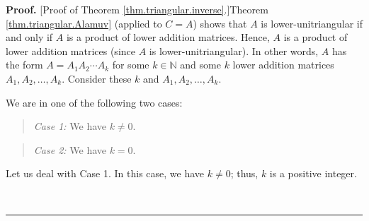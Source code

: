 \documentclass[numbers=enddot,12pt,final,onecolumn,notitlepage]{scrartcl}%
\theoremstyle{definition}
\newenvironment{statement}{\begin{quote}}{\end{quote}}
\newenvironment{proof}[1][Proof]{\noindent\textbf{#1.} }{\ \rule{0.5em}{0.5em}}
\begin{document}
\begin{proof}
[Proof of Theorem \ref{thm.triangular.inverse}.]Theorem
\ref{thm.triangular.Alamuv} (applied to $C=A$) shows that $A$ is
lower-unitriangular if and only if $A$ is a product of lower addition
matrices. Hence, $A$ is a product of lower addition matrices (since $A$ is
lower-unitriangular). In other words, $A$ has the form $A=A_{1}A_{2}\cdots
A_{k}$ for some $k\in\mathbb{N}$ and some $k$ lower addition matrices
$A_{1},A_{2},\ldots,A_{k}$. Consider these $k$ and $A_{1},A_{2},\ldots,A_{k}$.

We are in one of the following two cases:

\begin{statement}
\textit{Case 1:} We have $k\neq0$.
\end{statement}

\begin{statement}
\textit{Case 2:} We have $k=0$.
\end{statement}

Let us deal with Case 1. In this case, we have $k\neq0$; thus, $k$ is a
positive integer.


\end{proof}
\end{document}
